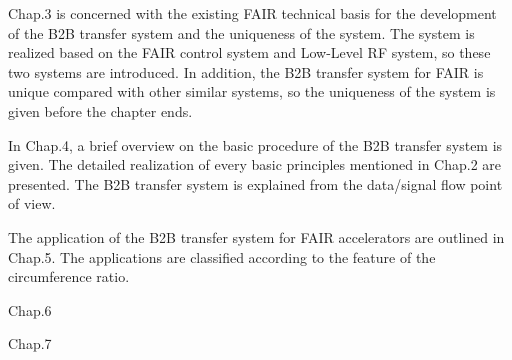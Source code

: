 Chap.3 is concerned with the existing FAIR technical basis for the development of the B2B transfer system and the uniqueness of the system. The system is realized based on the FAIR control system and Low-Level RF system, so these two systems are introduced. In addition, the B2B transfer system for FAIR is unique compared with other similar systems, so the uniqueness of the system is given before the chapter ends. 

In Chap.4, a brief overview on the basic procedure of the B2B transfer system is given. The detailed realization of every basic principles mentioned in Chap.2 are presented. The B2B transfer system is explained from the data/signal flow point of view.

The application of the B2B transfer system for FAIR accelerators are outlined in Chap.5. The applications are classified according to the feature of the circumference ratio.  

Chap.6

Chap.7

